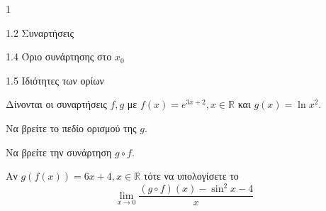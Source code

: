 \begin{ylh}{1}
    \item 1.2 Συναρτήσεις
    \item 1.4 Όριο συνάρτησης στο $x_0$
    \item 1.5 Ιδιότητες των ορίων
\end{ylh}
Δίνονται οι συναρτήσεις $f,g$ με $f(x)=e^{3x+2}, x \in \mathbb{R}$ και $g(x)=\ln x^2$.
\begin{alist}
    \item Να βρείτε το πεδίο ορισμού της $g$. 
    \item Να βρείτε την συνάρτηση $g \circ f$. 
    \item Αν $g(f(x)) = 6x + 4, x \in \mathbb{R}$ τότε να υπολογίσετε το
    \[ \lim_{x \to 0} \frac{(g \circ f)(x) - \sin^2 x - 4}{x} \] 
\end{alist}